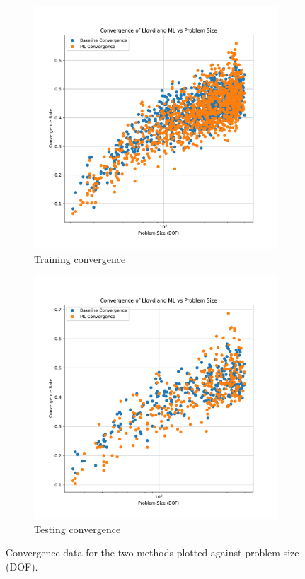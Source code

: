 \documentclass{article}
\begin{document}
\begin{figure}[h]
  \centering
  \begin{subfigure}[t]{0.49\textwidth}
    \centering
    \includegraphics[width=\textwidth]{iso_train_convergence_per_size.pdf}
    \caption{Training convergence}
  \end{subfigure}
  \begin{subfigure}[t]{0.49\textwidth}
    \centering
    \includegraphics[width=\textwidth]{iso_test_convergence_per_size.pdf}
    \caption{Testing convergence}
  \end{subfigure}
  \caption{Convergence data for the two methods plotted against problem size (DOF).}
  \label{fig:conv_per_size}
\end{figure}
\end{document}
